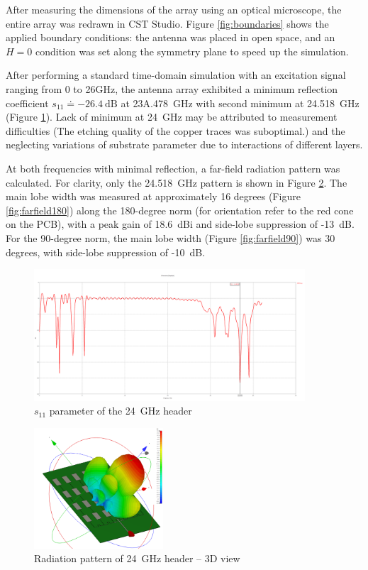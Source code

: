After measuring the dimensions of the array using an optical microscope, the entire array was redrawn in CST Studio.
Figure \ref{fig:boundaries} shows the applied boundary conditions: the antenna was placed in open space, and an $H=0$ condition was set along the symmetry plane to speed up the simulation.

After performing a standard time-domain simulation with an excitation signal ranging from 0 to 26GHz, the antenna array exhibited a minimum reflection coefficient $s_{11} \doteq -26.4 \mathrm{~dB}$ at 23A.478~GHz with second minimum at 24.518~GHz (Figure \ref{fig:s11}).
Lack of minimum at 24~GHz may be attributed to measurement difficulties (The etching quality of the copper traces was suboptimal.) and the neglecting variations of substrate parameter due to interactions of different layers.

At both frequencies with minimal reflection, a far-field radiation pattern was calculated.
For clarity, only the 24.518~GHz pattern is shown in Figure \ref{fig:farfield3d}.
The main lobe width was measured at approximately 16 degrees (Figure \ref{fig:farfield180}) along the 180-degree norm (for orientation refer to the red cone on the PCB), with a peak gain of 18.6~dBi and side-lobe suppression of -13~dB.
For the 90-degree norm, the main lobe width (Figure \ref{fig:farfield90}) was 30 degrees, with side-lobe suppression of -10~dB.

\begin{figure}[h!]
	\centering
	\includegraphics[width=0.9\textwidth]{../img/s11.png}
	\caption[$s_{11}$ parameter of the 24~GHz header]{$s_{11}$ parameter of the 24~GHz header}
	\label{fig:s11}
\end{figure}


\begin{figure}[h!]
	\centering
	\includegraphics[width=0.43\textwidth]{../img/farfield3d.png}
	\caption[Radiation pattern of 24~GHz header -- 3D view]{Radiation pattern of 24~GHz header -- 3D view}
	\label{fig:farfield3d}
\end{figure}

